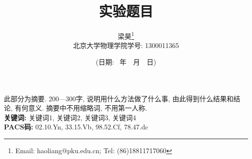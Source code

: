 \documentclass[12pt,a4paper]{article}
\def\chntoday{{\normalsize ({日期: }\the\year~年~\the\month~月~\the\day~日})}
\begin{document}
\title{\bf\Large 实验题目}
\author{{\fangsong\large 梁昊\footnote{Email: haoliang@pku.edu.cn; Tel: (86)18811717060}} \\ {\normalsize 北京大学物理学院\quad 学号: 1300011365}}
\date{\chntoday}

\maketitle

\abstract
\begin{spacing}{1.5}
此部分为摘要. 200—300字, 说明用什么方法做了什么事, 由此得到什么结果和结论, 有何意义. 摘要中不用缩略词, 不用第一人称.\vspace{20pt}\\
\noindent
{\bf 关键词: } 关键词1, 关键词2, 关键词3, 关键词4 \\ %
\noindent
{\bf PACS码: }02.10.Yn, 33.15.Vb, 98.52.Cf, 78.47.dc %
\end{spacing}
\end{document}
